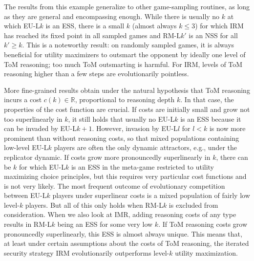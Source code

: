 \documentclass[10pt]{article}
\begin{document}
The results from this example generalize to other game-sampling
routines, as long as they are general and encompassing enough.  While
there is usually no $k$ at which EU-L$k$ is an ESS, there is a small
$k$ (almost always $k\le 3$) for which IRM has reached its fixed point
in all sampled games and RM-L$k'$ is an NSS for all $k' \ge k$. This
is a noteworthy result: on randomly sampled games, it is always
beneficial for utility maximizers to outsmart the opponent by ideally
one level of ToM reasoning; too much ToM outsmarting is harmful. For
IRM, levels of ToM reasoning higher than a few steps are
evolutionarily pointless.

More fine-grained results obtain under the natural hypothesis that ToM
reasoning incurs a cost $c(k) \in \mathds{R}$, proportional to
reasoning depth $k$. In that case, the properties of the cost function
are crucial. If costs are initially small and grow not too
superlinearly in $k$, it still holds that usually no EU-L$k$ is an ESS
because it can be invaded by EU-L$k+1$. However, invasion by EU-L$l$
for $l < k$ is now more prominent than without reasoning costs, so
that mixed populations containing low-level EU-L$k$ players are often
the only dynamic attractors, e.g., under the replicator dynamic. If
costs grow more pronouncedly superlinearly in $k$, there can be $k$
for which EU-L$k$ is an ESS in the meta-game restricted to utility
maximizing choice principles, but this requires very particular cost
functions and is not very likely. The most frequent outcome of
evolutionary competition between EU-L$k$ players under superlinear
costs is a mixed population of fairly low level-$k$ players. But all
of this only holds when RM-L$k$ is excluded from consideration. When
we also look at IMR, adding reasoning costs of any type results in
RM-L$k$ being an ESS for some very low $k$. If ToM reasoning costs
grow pronouncedly superlinearly, this ESS is almost always
unique. This means that, at least under certain assumptions about the
costs of ToM reasoning, the iterated security strategy IRM
evolutionarily outperforms level-$k$ utility maximization.
\end{document}
